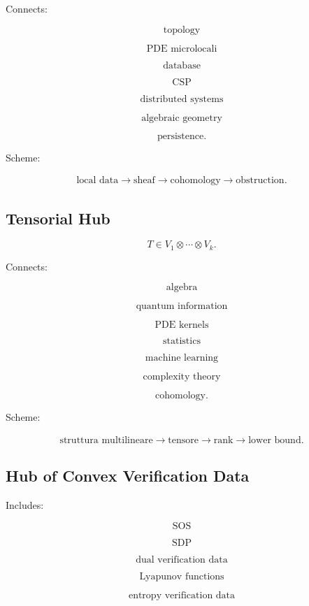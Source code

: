 \documentclass[11pt]{article}
\begin{document}
Connects:

\[
\text{topology}
\]

\[
\text{PDE microlocali}
\]

\[
\text{database}
\]

\[
\text{CSP}
\]

\[
\text{distributed systems}
\]

\[
\text{algebraic geometry}
\]

\[
\text{persistence}.
\]

Scheme:

\[
\begin{gathered}
\text{local data} \to \text{sheaf} \to \text{cohomology} \to \text{obstruction}.
\end{gathered}
\]



\subsection{Tensorial Hub}

\[
T\in V_1\otimes\cdots\otimes V_k.
\]

Connects:

\[
\text{algebra}
\]

\[
\text{quantum information}
\]

\[
\text{PDE kernels}
\]

\[
\text{statistics}
\]

\[
\text{machine learning}
\]

\[
\text{complexity theory}
\]

\[
\text{cohomology}.
\]

Scheme:

\[
\begin{gathered}
\text{struttura multilineare} \to \text{tensore} \to \text{rank} \to \text{lower bound}.
\end{gathered}
\]



\subsection{Hub of Convex Verification Data}

Includes:

\[
\text{SOS}
\]

\[
\text{SDP}
\]

\[
\text{dual verification data}
\]

\[
\text{Lyapunov functions}
\]

\[
\text{entropy verification data}
\]
\end{document}
